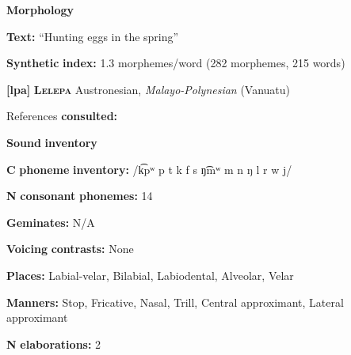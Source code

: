 \begin{styleBody}
\textbf{Morphology}
\end{styleBody}

\begin{styleBody}
\textbf{Text:} “Hunting eggs in the spring” \citep[95-96]{Ingham2003}
\end{styleBody}

\begin{styleBody}
\textbf{Synthetic} \textbf{index:} 1.3 morphemes/word (282 morphemes, 215 words)
\end{styleBody}

\begin{styleBody}
\textbf{[lpa]}   \textbf{\textsc{Lelepa}}  Austronesian, \textit{Malayo-Polynesian} (Vanuatu)
\end{styleBody}

\begin{styleBody}
References \textbf{consulted:} \citet{Lacrampe2014}
\end{styleBody}

\begin{styleBody}
\textbf{Sound} \textbf{inventory}
\end{styleBody}

\begin{styleBody}
\textbf{C} \textbf{phoneme} \textbf{inventory:} /k͡pʷ p t k f s ŋ͡mʷ m n ŋ l r w j/
\end{styleBody}

\begin{styleBody}
\textbf{N} \textbf{consonant} \textbf{phonemes:} 14
\end{styleBody}

\begin{styleBody}
\textbf{Geminates:} N/A
\end{styleBody}

\begin{styleBody}
\textbf{Voicing} \textbf{contrasts:} None
\end{styleBody}

\begin{styleBody}
\textbf{Places:} Labial-velar, Bilabial, Labiodental, Alveolar, Velar
\end{styleBody}

\begin{styleBody}
\textbf{Manners:} Stop, Fricative, Nasal, Trill, Central approximant, Lateral approximant
\end{styleBody}

\begin{styleBody}
\textbf{N} \textbf{elaborations:} 2
\end{styleBody}

